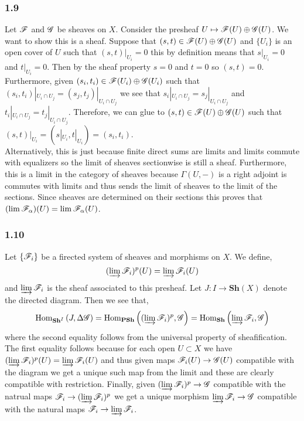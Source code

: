 \documentclass[12pt]{article}
\begin{document}
\subsubsection{1.9}

Let $\mathscr{F}$ and $\mathscr{G}$ be sheaves on $X$. Consider the presheaf $U \mapsto \mathscr{F}(U) \oplus \mathscr{G}(U)$. We want to show this is a sheaf. Suppose that $(s,t) \in \mathscr{F}(U) \oplus \mathscr{G}(U)$ and $\{ U_i \}$ is an open cover of $U$ such that $(s,t)|_{U_i} = 0$ this by definition means that $s|_{U_i} = 0$ and $t|_{U_i} = 0$. Then by the sheaf property $s = 0$ and $t = 0$ so $(s,t) = 0$. Furthermore, given $(s_i, t_i) \in \mathscr{F}(U_i) \oplus \mathscr{G}(U_i)$ such that $(s_i, t_i)|_{U_i \cap U_j} = (s_j, t_j) |_{U_i \cap U_j}$ we see that $s_i |_{U_i \cap U_j} = s_j |_{U_i \cap U_j}$ and $t_i |_{U_i \cap U_j} = t_j |_{U_i \cap U_j}$. Therefore, we can glue to $(s, t) \in \mathscr{F}(U) \oplus \mathscr{G}(U)$ such that $(s,t)|_{U_i} = (s|_{U_i}, t|_{U_i}) = (s_i, t_i)$. 
\bigskip\\
Alternatively, this is just because finite direct sums are limits and limits commute with equalizers so the limit of sheaves sectionwise is still a sheaf. Furthermore, this is a limit in the category of sheaves because $\Gamma(U,-)$ is a right adjoint is commutes with limits and thus sends the limit of sheaves to the limit of the sections. Since sheaves are determined on their sections this proves that $(\lim \mathscr{F}_\alpha)(U) = \lim \mathscr{F}_{\alpha}(U)$.


\subsubsection{1.10}

Let $\{ \mathscr{F}_i \}$ be a firected system of sheaves and morphisms on $X$. We define,
\[ (\varinjlim \mathscr{F}_i)^p(U) = \varinjlim \mathscr{F}_i(U) \]
and $\varinjlim \mathscr{F}_i$ is the sheaf associated to this presheaf. Let $J : I \to \mathbf{Sh}(X)$ denote the directed diagram. Then we see that,
\[ \mathrm{Hom}_{\mathbf{Sh}^I} \left( J, \Delta \mathscr{G} \right) = \mathrm{Hom}_{\mathbf{PSh}} \left( (\varinjlim \mathscr{F}_i)^p, \mathscr{G} \right) = \mathrm{Hom}_{\mathbf{Sh}} \left( \varinjlim \mathscr{F}_i, \mathscr{G} \right) \]
where the second equality follows from the universal property of sheafification. The first equality follows because for each open $U \subset X$ we have $(\varinjlim \mathscr{F}_i)^p(U) = \varinjlim \mathscr{F}_i(U)$ and thus given maps $\mathscr{F}_i(U) \to \mathscr{G}(U)$ compatible with the diagram we get a unique such map from the limit and these are clearly compatible with restriction. Finally, given $(\varinjlim \mathscr{F}_i)^p \to \mathscr{G}$ compatible with the natrual maps $\mathscr{F}_i \to (\varinjlim \mathscr{F}_i)^p$ we get a unique morphism $\varinjlim \mathscr{F}_i \to \mathscr{G}$ compatible with the natural maps $\mathscr{F}_i \to \varinjlim \mathscr{F}_i$.
\end{document}
